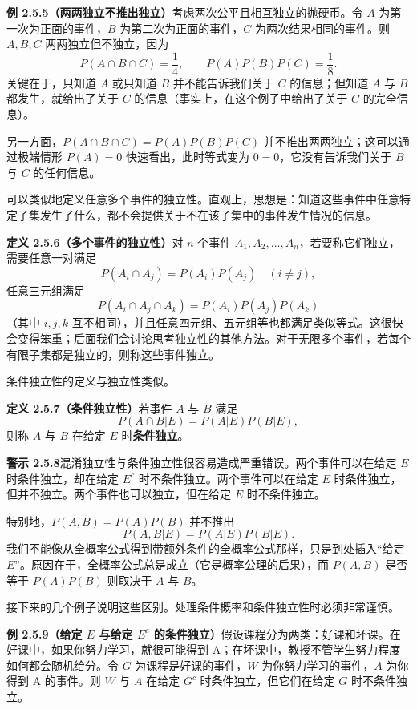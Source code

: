 \documentclass[UTF8, 12pt, fontset=fandol, oneside]{ctexart}
\begin{document}
\noindent\textbf{例 2.5.5（两两独立不推出独立）}\quad 考虑两次公平且相互独立的抛硬币。令 $A$ 为第一次为正面的事件，$B$ 为第二次为正面的事件，$C$ 为两次结果相同的事件。则 $A,B,C$ 两两独立但不独立，因为
\[
  P(A\cap B\cap C)=\frac14,\qquad P(A)P(B)P(C)=\frac18.
\]
关键在于，只知道 $A$ 或只知道 $B$ 并不能告诉我们关于 $C$ 的信息；但知道 $A$ 与 $B$ 都发生，就给出了关于 $C$ 的信息（事实上，在这个例子中给出了关于 $C$ 的完全信息）。

另一方面，$P(A\cap B\cap C)=P(A)P(B)P(C)$ 并不推出两两独立；这可以通过极端情形 $P(A)=0$ 快速看出，此时等式变为 $0=0$，它没有告诉我们关于 $B$ 与 $C$ 的任何信息。

可以类似地定义任意多个事件的独立性。直观上，思想是：知道这些事件中任意特定子集发生了什么，都不会提供关于不在该子集中的事件发生情况的信息。

\noindent\textbf{定义 2.5.6（多个事件的独立性）}\quad 对 $n$ 个事件 $A_1,A_2,\ldots,A_n$，若要称它们独立，需要任意一对满足
\[
  P(A_i\cap A_j)=P(A_i)P(A_j)\quad (i\ne j),
\]
任意三元组满足
\[
  P(A_i\cap A_j\cap A_k)=P(A_i)P(A_j)P(A_k)
\]
（其中 $i,j,k$ 互不相同），并且任意四元组、五元组等也都满足类似等式。这很快会变得笨重；后面我们会讨论思考独立性的其他方法。对于无限多个事件，若每个有限子集都是独立的，则称这些事件独立。

条件独立性的定义与独立性类似。

\noindent\textbf{定义 2.5.7（条件独立性）}\quad 若事件 $A$ 与 $B$ 满足
\[
  P(A\cap B|E)=P(A|E)P(B|E),
\]
则称 $A$ 与 $B$ 在给定 $E$ 时\textbf{条件独立}。

\noindent\textbf{警示 2.5.8}\quad 混淆独立性与条件独立性很容易造成严重错误。两个事件可以在给定 $E$ 时条件独立，却在给定 $E^c$ 时不条件独立。两个事件可以在给定 $E$ 时条件独立，但并不独立。两个事件也可以独立，但在给定 $E$ 时不条件独立。

特别地，$P(A,B)=P(A)P(B)$ 并不推出
\[
  P(A,B|E)=P(A|E)P(B|E).
\]
我们不能像从全概率公式得到带额外条件的全概率公式那样，只是到处插入“给定 $E$”。原因在于，全概率公式总是成立（它是概率公理的后果），而 $P(A,B)$ 是否等于 $P(A)P(B)$ 则取决于 $A$ 与 $B$。

接下来的几个例子说明这些区别。处理条件概率和条件独立性时必须非常谨慎。

\noindent\textbf{例 2.5.9（给定 $E$ 与给定 $E^c$ 的条件独立）}\quad 假设课程分为两类：好课和坏课。在好课中，如果你努力学习，就很可能得到 A；在坏课中，教授不管学生努力程度如何都会随机给分。令 $G$ 为课程是好课的事件，$W$ 为你努力学习的事件，$A$ 为你得到 A 的事件。则 $W$ 与 $A$ 在给定 $G^c$ 时条件独立，但它们在给定 $G$ 时不条件独立。
\end{document}
